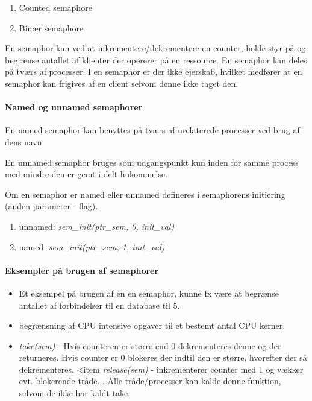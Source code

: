 \begin{enumerate}
	\item Counted semaphore
	\item Binær semaphore
\end{enumerate}

En semaphor kan ved at inkrementere/dekrementere en counter, holde styr på og begrænse antallet af klienter der opererer på en ressource. En semaphor kan deles på tværs af processer. I en semaphor er der ikke ejerskab, hvilket medfører at en semaphor kan frigives af en client selvom denne ikke taget den.

\paragraph{Named og unnamed semaphorer}
En named semaphor kan benyttes på tværs af urelaterede processer ved brug af dens navn.

En unnamed semaphor bruges som udgangspunkt kun inden for samme process med mindre den er gemt i delt hukommelse. 

Om en semaphor er named eller unnamed defineres i semaphorens initiering (anden parameter - flag).

\begin{enumerate}
\item unnamed: \textit{sem\_init(ptr\_sem, 0, init\_val)}
\item named: \textit{sem\_init(ptr\_sem, 1, init\_val)}
\end{enumerate}

\paragraph{Eksempler på brugen af semaphorer}

\begin{itemize}
	\item Et eksempel på brugen af en en semaphor, kunne fx være at begrænse antallet af forbindelser til en database til 5.
	\item begrænsning af CPU intensive opgaver til et bestemt antal CPU kerner.  \\
	\item \textit{take(sem)} - Hvis counteren er større end 0 dekrementeres denne og der returneres. Hvis counter er 0 blokeres der indtil den er større, hvorefter der så dekrementeres.
	<item \textit{release(sem)} - inkrementerer counter med 1 og vækker evt. blokerende tråde. \todo. Alle tråde/processer kan kalde denne funktion, selvom de ikke har kaldt take.
\end{itemize}

